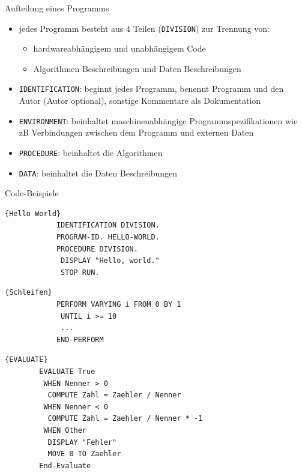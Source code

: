 \documentclass{beamer}
\begin{document}
\begin{frame}{Aufteilung eines Programms}
	\begin{itemize}[<+->]
		\item
			jedes Programm besteht aus 4 Teilen (\texttt{DIVISION}) zur Trennung von:
			\begin{itemize}[<+->]
			 	\item hardwareabh\"angigem und unabh\"angigem Code
				\item Algorithmen Beschreibungen und Daten Beschreibungen
			 \end{itemize}
		\item
			\texttt{IDENTIFICATION}: beginnt jedes Programm, benennt Programm und den Autor (Autor optional), sonstige Kommentare als Dokumentation
		\item
			\texttt{ENVIRONMENT}: beinhaltet maschinenabhängige Programmspezifikationen wie zB Verbindungen zwischen dem Programm und externen Daten
		\item
			\texttt{PROCEDURE}: beinhaltet die Algorithmen
		\item
			\texttt{DATA}: beinhaltet die Daten Beschreibungen
	\end{itemize}
\end{frame}

\begin{frame}[fragile]{Code-Beispiele}
	\onslide<1-1>
	\noindent\begin{minipage}{.44\textwidth}
		\begin{lstlisting}{Hello World}
			IDENTIFICATION DIVISION.
			PROGRAM-ID. HELLO-WORLD.
			PROCEDURE DIVISION.
			 DISPLAY "Hello, world."
			 STOP RUN.
		\end{lstlisting}
	\end{minipage}\hfill\pause
	\noindent\begin{minipage}{.53\textwidth}
		\begin{lstlisting}{Schleifen}
			PERFORM VARYING i FROM 0 BY 1
			 UNTIL i >= 10
			 ...
			END-PERFORM
		\end{lstlisting}
	\end{minipage}\pause
	\lstset{numbers=left,firstnumber=1}
	\begin{lstlisting}{EVALUATE}
		EVALUATE True
		 WHEN Nenner > 0
		  COMPUTE Zahl = Zaehler / Nenner
		 WHEN Nenner < 0
		  COMPUTE Zahl = Zaehler / Nenner * -1
		 WHEN Other
		  DISPLAY "Fehler"
		  MOVE 0 TO Zaehler
		End-Evaluate
	\end{lstlisting}
\end{frame}
\end{document}
